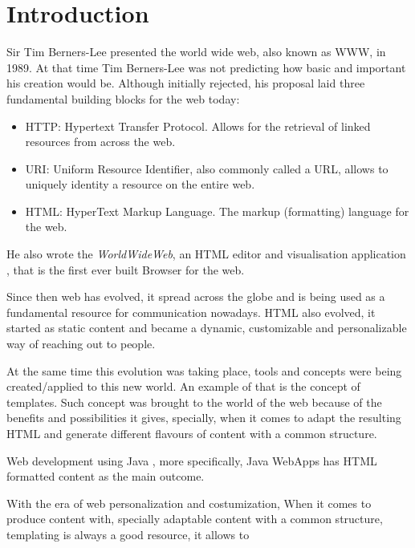 \chapter{Introduction}

Sir Tim Berners-Lee presented the world wide web, also known as WWW, in 1989. At that time Tim Berners-Lee was not predicting how basic and important his creation would be. Although initially rejected, his proposal laid three fundamental building blocks for the web today:

\begin{itemize}
    \item HTTP: Hypertext Transfer Protocol. Allows for the retrieval of linked resources from across the web.
    \item URI: Uniform Resource Identifier, also commonly called a URL, allows to uniquely identity a resource on the entire web.
    \item HTML: HyperText Markup Language. The markup (formatting) language for the web.
\end{itemize}

He also wrote the \textit{WorldWideWeb}, an HTML editor and visualisation application , that is the first ever built Browser for the web.

Since then web has evolved, it spread across the globe and is being used as a fundamental resource for communication nowadays. HTML also evolved, it started as static content and became a dynamic, customizable and personalizable way of reaching out to people.

At the same time this evolution was taking place, tools and concepts were being created/applied to this new world. An example of that is the concept of templates. Such concept was brought to the world of the web because of the benefits and possibilities it gives, specially, when it comes to adapt the resulting HTML and generate different flavours of content with a common structure.

Web development using Java , more specifically, Java WebApps  has HTML formatted content  as the main outcome.

With the era of web personalization and costumization, 
When it comes to produce content with, specially adaptable content with a common structure, templating is always a good resource, it allows to  
